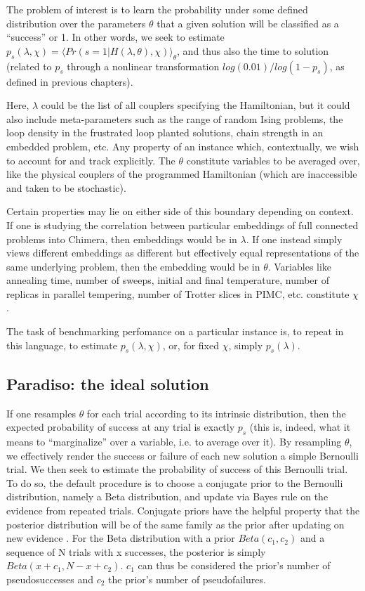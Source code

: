 The problem of interest is to learn the probability under some defined distribution over the parameters $\theta$ that a given solution will be classified as a ``success'' or 1. In other words, we seek to estimate $p_s(\lambda,\chi) = \langle Pr(s=1|H(\lambda,\theta),\chi) \rangle_\theta$, and thus also the time to solution (related to $p_s$ through a nonlinear transformation $log(0.01)/log(1-p_s)$, as defined in previous chapters).

Here, $\lambda$ could be the list of all couplers specifying the Hamiltonian, but it could also include meta-parameters such as the range of random Ising problems, the loop density in the frustrated loop planted solutions, chain strength in an embedded problem, etc. Any property of an instance which, contextually, we wish to account for and track explicitly. The $\theta$ constitute variables to be averaged over, like the physical couplers of the programmed Hamiltonian (which are inaccessible and taken to be stochastic).

Certain properties may lie on either side of this boundary depending on context. If one is studying the correlation between particular embeddings of full connected problems into Chimera, then embeddings would be in $\lambda$. If one instead simply views different embeddings as different but effectively equal representations of the same underlying problem, then the embedding would be in $\theta$. Variables like annealing time, number of sweeps, initial and final temperature, number of replicas in parallel tempering, number of Trotter slices in PIMC, etc. constitute $\chi$.

The task of benchmarking perfomance on a particular instance is, to repeat in this language, to estimate $p_s(\lambda,\chi)$, or, for fixed $\chi$, simply $p_s(\lambda)$.

\subsection{Paradiso: the ideal solution}
If one resamples $\theta$ for each trial according to its intrinsic distribution, then the expected probability of success at any trial is exactly $p_s$ (this is, indeed, what it means to ``marginalize'' over a variable, i.e. to average over it). By resampling $\theta$, we effectively render the success or failure of each new solution a simple Bernoulli trial. We then seek to estimate the probability of success of this Bernoulli trial. To do so, the default procedure is to choose a conjugate prior to the Bernoulli distribution, namely a Beta distribution, and update via Bayes rule on the evidence from repeated trials. Conjugate priors have the helpful property that the posterior distribution will be of the same family as the prior after updating on new evidence \cite{jaynes2003probability}. For the Beta distribution with a prior $Beta(c_1,c_2)$ and a sequence of N trials with x successes, the posterior is simply $Beta(x+c_1,N-x+c_2)$. $c_1$ can thus be considered the prior's number of pseudosuccesses and $c_2$ the prior's number of pseudofailures.

